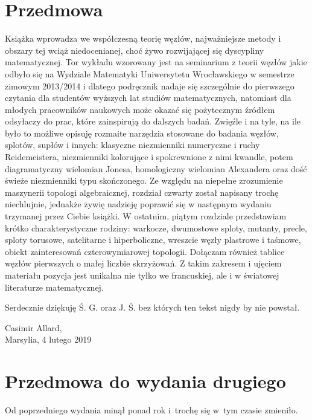 

\section*{Przedmowa}
Książka wprowadza we współczesną teorię węzłów, najważniejsze metody i obszary tej wciąż niedocenianej, choć żywo rozwijającej się dyscypliny matematycznej.
Tor wykładu wzorowany jest na seminarium z teorii węzłów jakie odbyło się na Wydziale Matematyki Uniwersytetu Wrocławskiego w semestrze zimowym 2013/2014 i dlatego podręcznik nadaje się szczególnie do pierwszego czytania dla studentów wyższych lat studiów matematycznych, natomiast dla młodych pracowników naukowych może okazać się pożytecznym źródłem odsyłaczy do prac, które zainspirują do dalszych badań.
Zwięźle i na tyle, na ile było to możliwe opisuję rozmaite narzędzia stosowane do badania węzłów, splotów, supłów i innych: klasyczne niezmienniki numeryczne i ruchy Reidemeistera, niezmienniki kolorujące i spokrewnione z nimi kwandle, potem diagramatyczny wielomian Jonesa, homologiczny wielomian Alexandera oraz dość świeże niezmienniki typu skończonego.
Ze względu na niepełne zrozumienie maszynerii topologi algebraicznej, rozdział czwarty został napisany trochę niechlujnie, jednakże żywię nadzieję poprawić się w następnym wydaniu trzymanej przez Ciebie książki.
W ostatnim, piątym rozdziale przedstawiam krótko charakterystyczne rodziny: warkocze, dwumostowe sploty, mutanty, precle, sploty torusowe, satelitarne i hiperboliczne, wreszcie węzły plastrowe i taśmowe, obiekt zainteresowań czterowymiarowej topologii.
Dołączam również tablice węzłów pierwszych o małej liczbie skrzyżowań.
Z takim zakresem i ujęciem materiału pozycja jest unikalna nie tylko we francuskiej, ale i w światowej literaturze matematycznej.

Serdecznie dziękuję Ś. G. oraz J. Ś. bez których ten tekst nigdy by nie powstał.

\begin{flushright}
Casimir Allard,\\Marsylia, 4 lutego 2019
\end{flushright}

\section*{Przedmowa do wydania drugiego}
Od poprzedniego wydania minął ponad rok i~trochę się w~tym czasie zmieniło.


